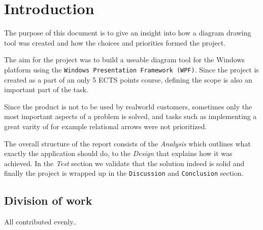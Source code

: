 \section{Introduction}
The purpose of this document is to give an insight into how a diagram drawing
tool was created and how the choices and priorities formed the project. 

The aim for the project was to build a useable diagram tool for the Windows
platform using the \texttt{Windows Presentation Framework (WPF)}. Since the project is
created as a part of an only 5 ECTS points course, defining the scope is also an
important part of the task.

Since the product is not to be used by realworld customers, sometimes only the
most important aspects of a problem is solved, and tasks such as implementing a great varity of for
example relational arrows were not prioritized.

The overall structure of the report consists of the
\textit{Analysis} which outlines what exactly the application should do, to the
\textit{Design} that explains how it was achieved. In the \textit{Test} section
we validate that the solution indeed is solid and finally the project is wrapped
up in the \texttt{Discussion} and \texttt{Conclusion} section.

\subsection{Division of work}
All contributed evenly..
